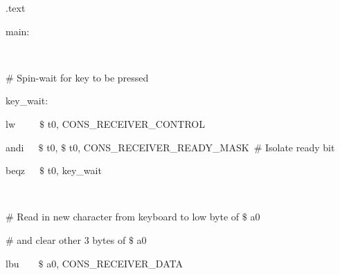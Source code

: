 \documentclass[12pt]{article}
\begin{document}
\begin{itemize}
{\fontsize{10pt}{12.0pt}\selectfont  \tabto{0.64in} \ \ \  .text\par}\par

{\fontsize{10pt}{12.0pt}\selectfont \ \ \  main:\par}\par

{\fontsize{10pt}{12.0pt}\selectfont \ \ \  \par}\par

{\fontsize{10pt}{12.0pt}\selectfont  \tabto{0.64in} \ \ \  $\#$  Spin-wait for key to be pressed\par}\par

{\fontsize{10pt}{12.0pt}\selectfont \ \ \  key\_wait:\par}\par

{\fontsize{10pt}{12.0pt}\selectfont  \tabto{0.64in} \ \ \  lw\ \ \ \ \  $\$$ t0, CONS\_RECEIVER\_CONTROL\par}\par

{\fontsize{10pt}{12.0pt}\selectfont  \tabto{0.64in} \ \ \  andi\ \ \  $\$$ t0, $\$$ t0, CONS\_RECEIVER\_READY\_MASK\  $\#$  Isolate ready bit\par}\par

{\fontsize{10pt}{12.0pt}\selectfont  \tabto{0.64in} \ \ \  beqz\ \ \  $\$$ t0, key\_wait\par}\par

{\fontsize{10pt}{12.0pt}\selectfont \ \ \  \par}\par

{\fontsize{10pt}{12.0pt}\selectfont  \tabto{0.64in} \ \ \  $\#$  Read in new character from keyboard to low byte of $\$$ a0\par}\par

{\fontsize{10pt}{12.0pt}\selectfont  \tabto{0.64in} \ \ \  $\#$  and clear other 3 bytes of $\$$ a0\par}\par

{\fontsize{10pt}{12.0pt}\selectfont  \tabto{0.64in} \ \ \  lbu\ \ \ \  $\$$ a0, CONS\_RECEIVER\_DATA\par}\par

{\fontsize{10pt}{12.0pt}\selectfont  \tabto{0.64in} \ \ \  \par}\par


\end{itemize}
\end{document}
